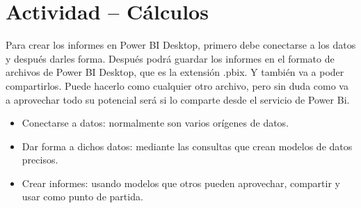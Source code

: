  \section{Actividad – Cálculos} 
Para crear los informes en Power BI Desktop, primero debe conectarse a los datos y después darles forma. Después podrá guardar los informes en el formato de archivos de Power BI Desktop, que es la extensión .pbix. Y también va a poder compartirlos. Puede hacerlo como cualquier otro archivo, pero sin duda como va a aprovechar todo su potencial será si lo comparte desde el servicio de Power Bi.
\begin{itemize}
	\item Conectarse a datos: normalmente son varios orígenes de datos.
	\item Dar forma a dichos datos: mediante las consultas que crean modelos de datos precisos.
	\item Crear informes: usando modelos que otros pueden aprovechar, compartir y usar como punto de partida.\\
\end{itemize} 

